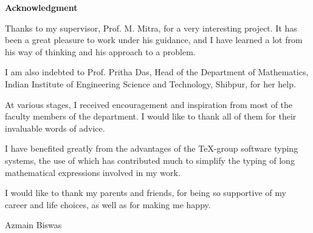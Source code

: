 \vspace{5cm}

\begin{center}
    \LARGE{\textbf{Acknowledgment}}
\end{center}
\vspace{2cm}
    Thanks to my supervisor, Prof. M. Mitra, for a very interesting project. It has been a great pleasure to work under his guidance, and I have learned a lot from his way of thinking and his approach to a problem. 
    \vspace{0.2cm}

    I am also indebted to Prof. Pritha Das, Head of the Department of Mathematics, Indian Institute of Engineering Science and Technology, Shibpur, for her help. 

    \vspace{0.2cm}
    At various stages, I received encouragement and inspiration from most of the faculty members of the department. I would like to thank all of them for their invaluable words of advice.

    \vspace{0.2cm}
    I have benefited greatly from the advantages of the \TeX-group software typing systems, the use of which has contributed much to simplify the typing of long mathematical expressions involved in my work.

    \vspace{0.2cm}
    I would like to thank my parents and friends, for being so supportive of my career and life choices, as well as for making me happy.

    \vspace{2cm}
    \begin{flushright}
        Azmain Biswas
    \end{flushright}
